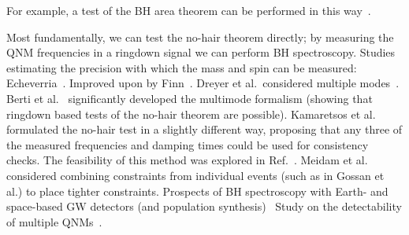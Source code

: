 
For example, a test of the BH area theorem can be performed in this way~\cite{Hawking:1971tu, Cabero:2017avf, Isi:2020tac}.


Most fundamentally, we can test the no-hair theorem directly; by measuring the QNM frequencies in a ringdown signal we can perform BH spectroscopy.
Studies estimating the precision with which the mass and spin can be measured:
Echeverria~\cite{Echeverria:1989hg}.
Improved upon by Finn~\cite{Finn:1992wt}.
Dreyer et al.\ considered multiple modes~\cite{Dreyer:2003bv}.
Berti et al.~\cite{Berti:2005ys, Berti:2007zu} significantly developed the multimode formalism (showing that ringdown based tests of the no-hair theorem are possible). 
Kamaretsos et al.~\cite{Kamaretsos:2011um} formulated the no-hair test in a slightly different way, proposing that any three of the measured frequencies and damping times could be used for consistency checks. 
The feasibility of this method was explored in Ref.~\cite{Gossan:2011ha}.
Meidam et al.~\cite{Meidam:2014jpa} considered combining constraints from individual events (such as in Gossan et al.) to place tighter constraints. 
Prospects of BH spectroscopy with Earth- and space-based GW detectors (and population synthesis)~\cite{Berti:2016lat}
Study on the detectability of multiple QNMs~\cite{Baibhav:2018rfk}.

